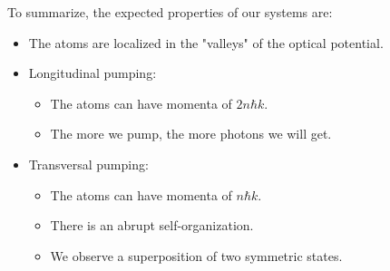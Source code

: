 \noindent To summarize, the expected properties of our systems are:

\begin{itemize}
	\item The atoms are localized in the "valleys" of the optical potential.
	\item Longitudinal pumping:
		\begin{itemize}
			\item The atoms can have momenta of $2 n \hbar k$.
			\item The more we pump, the more photons we will get.
		\end{itemize}
	\item Transversal pumping:
		\begin{itemize}
			\item The atoms can have momenta of $n \hbar k$.
			\item There is an abrupt self-organization.
			\item We observe a superposition of two symmetric states.
		\end{itemize}
\end{itemize}